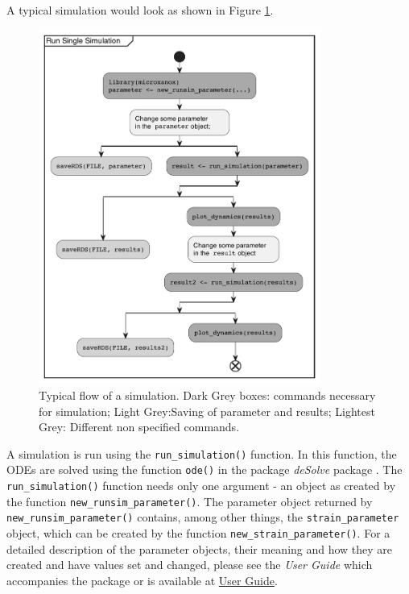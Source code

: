 \documentclass[preprint,12pt, a4paper]{elsarticle}
\begin{document}
A typical simulation would look as shown in Figure
\ref{fig:runsim_example}.

\begin{figure}

{\centering \includegraphics[width=350px]{./figures/simflow} 

}

\caption{Typical flow of a simulation. Dark Grey boxes: commands necessary for simulation; Light Grey:Saving of parameter and results; Lightest Grey: Different non specified commands.}\label{fig:runsim_example}
\end{figure}

A simulation is run using the \texttt{run\_simulation()} function. In
this function, the ODEs are solved using the function \texttt{ode()} in
the package \emph{deSolve} package \citep{Soetaert2010}. The
\texttt{run\_simulation()} function needs only one argument - an object
as created by the function \texttt{new\_runsim\_parameter()}. The
parameter object returned by \texttt{new\_runsim\_parameter()} contains,
among other things, the \texttt{strain\_parameter} object, which can be
created by the function \texttt{new\_strain\_parameter()}. For a
detailed description of the parameter objects, their meaning and how
they are created and have values set and changed, please see the
\emph{User Guide} which accompanies the package or is available at
\href{https://uzh-peg.r-universe.dev/articles/microxanox/User-guide.html}{User
Guide}.
\end{document}
